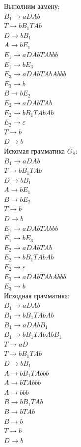 \documentclass[a4paper,14pt]{extarticle}
\begin{document}
\begin{enumerate}[1.]
Выполним замену:\\
$B_1 \rightarrow aDAb$\\
$T \rightarrow bB_1TAb$\\
$D \rightarrow bB_1$\\
$A \rightarrow bE_1$\\
$E_1 \rightarrow aDAbTAbbb$\\
$E_1 \rightarrow bE_3$\\ 
$E_3 \rightarrow aDAbTAbAbbb$\\
$E_3 \rightarrow b$\\
$B \rightarrow bE_2$\\
$E_2 \rightarrow aDAbTAb$\\
$E_2 \rightarrow bB_1TAbAb$\\
$E_2 \rightarrow \varepsilon$\\
$T \rightarrow b$\\
$D \rightarrow b$\\

Искомая грамматика $G_8$:\\
$B_1 \rightarrow aDAb$\\
$T \rightarrow bB_1TAb$\\
$D \rightarrow bB_1$\\
$A \rightarrow bE_1$\\
$B \rightarrow bE_2$\\
$T \rightarrow b$\\
$D \rightarrow b$\\
$E_1 \rightarrow aDAbTAbbb$\\
$E_1 \rightarrow bE_3$\\ 
$E_2 \rightarrow aDAbTAb$\\
$E_2 \rightarrow bB_1TAbAb$\\
$E_2 \rightarrow \varepsilon$\\
$E_3 \rightarrow aDAbTAbAbbb$\\
$E_3 \rightarrow b$\\

\iffalse
Исходная грамматика:\\
$B_1 \rightarrow aDAb$\\
$B_1 \rightarrow bB_1TAbAb$\\
$B_1 \rightarrow aDAbB_1$\\
$B_1 \rightarrow bB_1TAbAbB_1$\\
$T \rightarrow aD$\\ 
$T \rightarrow bB_1TAb$\\
$D \rightarrow bB_1$\\
$A \rightarrow bB_1TAbbb$\\
$A \rightarrow bTAbbb$\\
$A \rightarrow bbb$\\
$B \rightarrow bB_1TAb$\\ 
$B \rightarrow bTAb$\\ 
$B \rightarrow b$\\
$T \rightarrow b$\\
$D \rightarrow b$\\


\end{enumerate}
\end{document}
